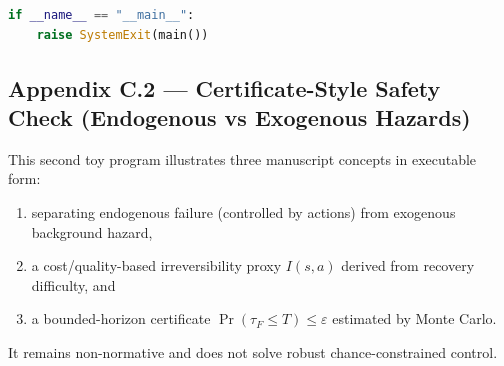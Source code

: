 \begin{lstlisting}[language=Python,basicstyle=\ttfamily\scriptsize]
if __name__ == "__main__":
    raise SystemExit(main())
\end{lstlisting}

\subsection*{Appendix C.2 --- Certificate-Style Safety Check
(Endogenous vs Exogenous Hazards)}

This second toy program illustrates three manuscript concepts in
executable form:

\begin{enumerate}
\item separating endogenous failure (controlled by actions) from
exogenous background hazard,
\item a cost/quality-based irreversibility proxy $I(s, a)$ derived
from recovery difficulty, and
\item a bounded-horizon certificate
$\Pr(\tau_F \le T) \le \varepsilon$ estimated by Monte Carlo.
\end{enumerate}

It remains non-normative and does not solve robust
chance-constrained control.

